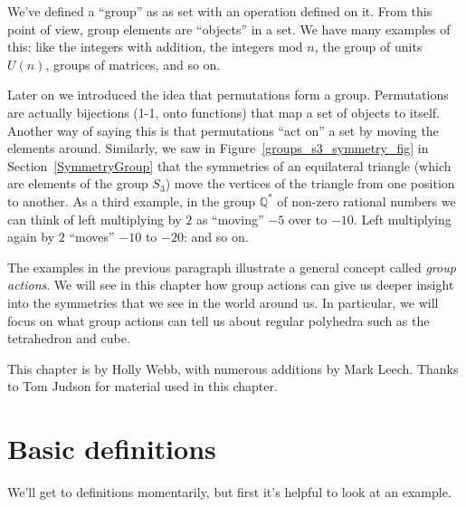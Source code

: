 We've defined a  ``group'' as as set with an operation defined on it.  From this point of view, group elements are ``objects'' in a set. We have many examples of this: like the integers with addition, the integers mod $n$, the group of units $U(n)$, groups of matrices, and so on.

Later on we introduced the idea that permutations form a group. Permutations are actually bijections (1-1, onto functions) that map a set of objects to itself.  Another way of saying this is that permutations ``act on'' a set by moving the elements around.  Similarly, we saw in Figure~\ref{groups_s3_symmetry_fig} in Section~\ref{SymmetryGroup} that the symmetries of an equilateral triangle (which are elements of the group $S_3$) move the vertices of the triangle from one position to another.  As a third example, in the group $\mathbb {Q}^*$ of non-zero rational numbers we can think of left multiplying by $2$ as ``moving''  $-5$ over to $-10$.  Left multiplying again by $2$ ``moves'' $-10$ to $-20$: and so on.   

The examples in the previous paragraph  illustrate a general concept called \emph{group actions}. We will see in this chapter how group actions can give us deeper insight into the symmetries that we see in the world around us. In particular, we will focus on what group actions can tell us about regular polyhedra such as the tetrahedron and cube.
\bigskip

This chapter  is by Holly Webb, with numerous additions by Mark Leech. Thanks to Tom Judson for material used in this chapter.

\section{Basic definitions\quad
{}}\label{DefActions}
We'll get to definitions momentarily, but first it's helpful to look at an example.

